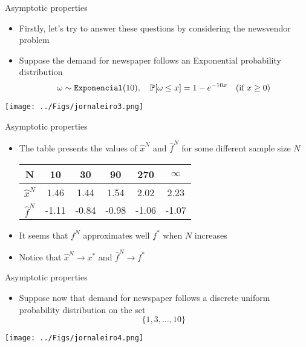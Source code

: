 \begin{frame}{Asymptotic properties}
\begin{itemize}
\item Firstly, let's try to answer these questions by considering the newsvendor problem
\pula

\item Suppose the demand for newspaper follows an Exponential probability distribution
\[
\omega \sim {\tt Exponencial}(10),
\quad \mathbb{P}[\omega \leq x]= 1 - e^{-10x}\quad \mbox{(if $x\geq 0$)}
\]
\end{itemize}
\begin{center}
\texttt{[image: ../Figs/jornaleiro3.png]} {}
\end{center}
\end{frame}





\begin{frame}{Asymptotic properties}

\begin{itemize}

\item The table presents the values of $\hat x^N$ and $\hat f^N$ for some different sample size $N$

\begin{center}
\begin{tabular}{|c|c|c|c|c|c|}
\hline
N & 10 & 30 & 90 & 270 & $\infty$ \\
\hline
$\hat x^N$ & 1.46 & 1.44 & 1.54 & 2.02 & 2.23 \\
\hline
$\hat f^N$ & -1.11 & -0.84 & -0.98 & -1.06 & -1.07 \\
\hline
\end{tabular}
\end{center}
\item It seems that $f^N$ approximates well $f^*$ when $N$ increases
\pula

\item Notice that $\hat x^N \to x^*$ and $\hat f^N \to f^*$
\end{itemize}
 \end{frame}



\begin{frame}{Asymptotic properties}

\begin{itemize}
\item Suppose now that demand for newspaper follows a discrete uniform probability distribution on the set
\[
\{1,3,\ldots, 10\}\,
\]
\end{itemize}
\begin{center}
\texttt{[image: ../Figs/jornaleiro4.png]} {}
\end{center}
\end{frame}


